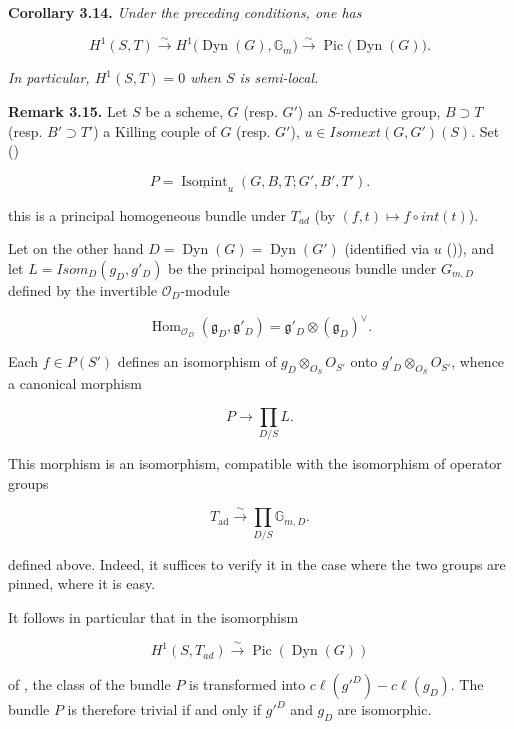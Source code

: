 \textbf{Corollary 3.14.} \emph{Under the preceding conditions, one has}

\[
  H^1(S,T)\xrightarrow{\sim}
  H^1\bigl(\operatorname{Dyn}(G),\mathbb G_m\bigr)
  \xrightarrow{\sim}\operatorname{Pic}\bigl(\operatorname{Dyn}(G)\bigr).
\]

\emph{In particular, \(H^{1}(S, T) = 0\) when \(S\) is semi-local.}

\textbf{Remark 3.15.} Let \(S\) be a scheme, \(G\) (resp. \(G'\)) an \(S\)-reductive group, \(B \supset T\) (resp. \(B' \supset T'\)) a
Killing couple of \(G\) (resp. \(G'\)), \(u \in Isomext(G, G')(S)\). Set ()

\[
  P=\underline{\operatorname{Isomint}}_u(G,B,T;G',B',T').
\]

this is a principal homogeneous bundle under \(T_{ad}\) (by \((f, t) \mapsto f \circ int(t)\)).

Let on the other hand \(D = \operatorname{Dyn}(G) = \operatorname{Dyn}(G')\) (identified via \(u\) ()), and let \(L = Isom_{D}(g_{D}, g'_{D})\) be the
principal homogeneous bundle under \(G_{m,D}\) defined by the invertible \(\mathcal O_D\)-module

\[
  \operatorname{Hom}_{\mathcal O_D}(\mathfrak g_D,\mathfrak g'_D)
  =\mathfrak g'_D\otimes(\mathfrak g_D)^\vee .
\]

Each \(f \in P(S')\) defines an isomorphism of \(g_{D} \otimes_{O_{S}} O_{S'}\) onto \(g'_{D} \otimes_{O_{S}} O_{S'}\), whence
a canonical morphism

\[ P \to \prod_{D/S} L. \]

This morphism is an isomorphism, compatible with the isomorphism of operator groups

\[
  T_{\mathrm{ad}}\xrightarrow{\sim}
  \prod_{D/S}\mathbb G_{m,D}.
\]

defined above. Indeed, it suffices to verify it in the case where the two groups are pinned, where it is easy.

It follows in particular that in the isomorphism

\[ H^{1}(S, T_{ad}) \xrightarrow{\sim} \operatorname{Pic}(\operatorname{Dyn}(G)) \]

of , the class of the bundle \(P\) is transformed into \(c\ell(g'^{D}) - c\ell(g_{D})\). The bundle \(P\) is therefore
trivial if and only if \(g'^{D}\) and \(g_{D}\) are isomorphic.

